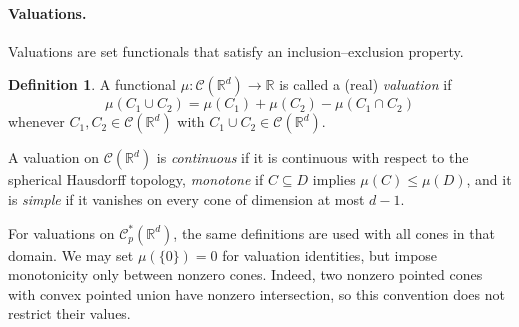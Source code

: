 \documentclass[11pt]{article}
\newcommand{\R}{\mathbb{R}}
\newcommand{\CC}{\mathcal{C}}
\newcommand{\vct}[1]{#1}
\newcommand{\zero}{\vct{0}}
\theoremstyle{plain}
\theoremstyle{definition}
\newtheorem{definition}[theorem]{Definition}
\begin{document}
\paragraph{Valuations.} Valuations are set functionals that satisfy an inclusion--exclusion property.

\begin{definition}
A functional $\mu\colon\CC(\R^d)\to\R$ is called a (real) \emph{valuation} if
\begin{equation*}
    \mu(C_1\cup C_2)=\mu(C_1)+\mu(C_2)-\mu(C_1\cap C_2)
\end{equation*}
whenever $C_1,C_2\in\CC(\R^d)$ with $C_1\cup C_2\in\CC(\R^d)$.
\end{definition}

A valuation on $\CC(\R^d)$ is \emph{continuous} if it is continuous with respect to the spherical Hausdorff topology, \emph{monotone} if $C\subseteq D$ implies $\mu(C)\le\mu(D)$,
and it is \emph{simple} if it vanishes on every cone of dimension at most $d-1$.

For valuations on $\CC_p^*(\R^d)$, the same definitions are used with
all cones in that domain.  We may set $\mu(\{\zero\})=0$ for valuation
identities, but impose monotonicity only between nonzero cones.
Indeed, two nonzero pointed cones with convex pointed union have
nonzero intersection, so this convention does not restrict their values.
\end{document}
